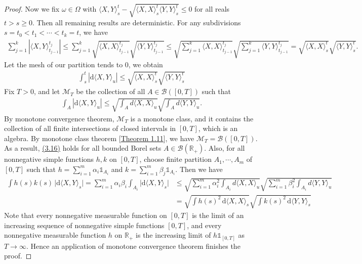 \documentclass{article}
\numberwithin{equation}{section}
\renewcommand{\d}{\mathrm{d}}
\theoremstyle{plain}
\theoremstyle{definition}
\begin{document}
\begin{proof}
Now we fix $\omega\in\Omega$ with $\langle X,Y\rangle_s^t - \sqrt{\langle X,X\rangle_s^t\langle Y,Y\rangle_s^t}\leq 0$ for all reals $t>s\geq 0$. Then all remaining results are deterministic. For any subdivisions $s=t_0<t_1<\cdots<t_k=t$, we have
\begin{align*}
	\sum_{j=1}^k\left\vert\langle X,Y\rangle_{t_{j-1}}^{t_j}\right\vert\leq\sum_{j=1}^k\sqrt{\langle X,X\rangle_{t_{j-1}}^{t_j}}\sqrt{\langle Y,Y\rangle_{t_{j-1}}^{t_j}}\leq\sqrt{\sum_{j=1}^k\langle X,X\rangle_{t_{j-1}}^{t_j}}\sqrt{\sum_{j=1}^k\langle Y,Y\rangle_{t_{j-1}}^{t_j}}=\sqrt{\langle X,X\rangle_s^t}\sqrt{\langle Y,Y\rangle_s^t}.
\end{align*}
Let the mesh of our partition tends to $0$, we obtain
\begin{align*}
	\int_s^t\left\vert\d\langle X,Y\rangle_u\right\vert \leq\sqrt{\langle X,X\rangle_s^t}\sqrt{\langle Y,Y\rangle_s^t}
\end{align*}
Fix $T>0$, and let $\mathscr{M}_T$ be the collection of all $A\in\mathscr{B}([0,T])$ such that
\begin{align*}
\int_A\left\vert\d\langle X,Y\rangle_u\right\vert \leq\sqrt{\int_A d\langle X,X\rangle_u}\sqrt{\int_A d\langle Y,Y\rangle_u}.\tag{3.16}\label{eq:3.16}
\end{align*}
By monotone convergence theorem, $\mathscr{M}_T$ is a monotone class, and it contains the collection of all finite intersections of closed intervals in $[0,T]$, which is an algebra. By monotone class theorem [\hyperref[thm:1.11]{Theorem 1.11}], we have $\mathscr{M}_T=\mathscr{B}([0,T])$. As a result, \hyperref[eq:3.16]{(3.16)} holds for all bounded Borel sets $A\in\mathscr{B}(\mathbb{R}_+)$. Also, for all nonnegative simple functions $h,k$ on $[0,T]$, choose finite partition $A_1,\cdots,A_m$ of $[0,T]$ such that $h=\sum_{i=1}^m \alpha_i\mathds{1}_{A_i}$ and $k=\sum_{i=1}^m \beta_j\mathds{1}_{A_i}$. Then we have
\begin{align*}
	\int h(s)k(s)\,\vert\d\langle X,Y\rangle_s\vert = \sum_{i=1}^m\alpha_i\beta_i \int_{A_i}\vert\d\langle X,Y\rangle_s\vert &\leq\sqrt{\sum_{i=1}^m\alpha_i^2\int_{A_i} d\langle X,X\rangle_u}\sqrt{\sum_{i=1}^m\beta_i^2\int_{A_i} d\langle Y,Y\rangle_u}\\
	&= \sqrt{\int h(s)^2\,\d \langle X,X\rangle_s}\sqrt{\int k(s)^2\,\d \langle Y,Y\rangle_s}
\end{align*}
Note that every nonnegative measurable function on $[0,T]$ is the limit of an increasing sequence of nonnegative simple functions $[0,T]$, and every nonnegative measurable function $h$ on $\mathbb{R}_+$ is the increasing limit of $h\mathds{1}_{[0,T]}$ as $T\to\infty$. Hence an application of monotone convergence theorem finishes the proof.
\end{proof}
\end{document}
